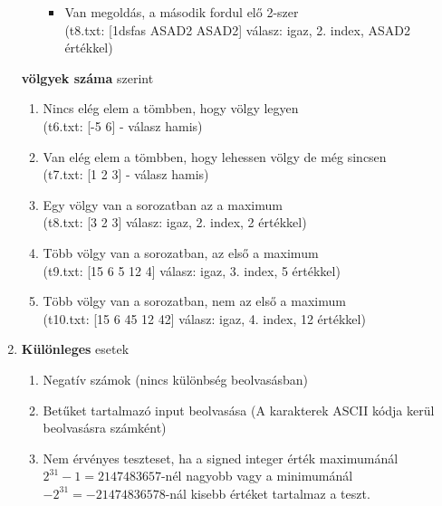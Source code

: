 \documentclass[12pt,a4paper]{article}			%
\begin{document}
\begin{enumerate}
\begin{enumerate}
\begin{itemize}[label={}]
					\item Van megoldás, a második fordul elő 2-szer\\
					(t8.txt: [1dsfas ASAD2 ASAD2] válasz: igaz, 2. index, ASAD2 értékkel)
				\end{itemize}
			\end{enumerate}
			\textbf{völgyek száma} szerint
				\begin{enumerate}
					\item Nincs elég elem a tömbben, hogy völgy legyen\\
					(t6.txt: [-5 6] - válasz hamis)
					\item Van elég elem a tömbben, hogy lehessen völgy de még sincsen\\
					(t7.txt: [1 2 3] - válasz hamis)
					\item Egy völgy van a sorozatban az a maximum\\
					(t8.txt: [3 2 3] válasz: igaz, 2. index, 2 értékkel)
					\item Több völgy van a sorozatban, az első a maximum\\
					(t9.txt: [15 6 5 12 4] válasz: igaz, 3. index, 5 értékkel)
					\item Több völgy van a sorozatban, nem az első a maximum\\
					(t10.txt: [15 6 45 12 42] válasz: igaz, 4. index, 12 értékkel)
				\end{enumerate}
			\item \textbf{Különleges} esetek
				\begin{enumerate}
					\item Negatív számok (nincs különbség beolvasásban)
					\item Betűket tartalmazó input beolvasása (A karakterek ASCII kódja kerül beolvasásra számként)
					\item Nem érvényes teszteset, ha a signed integer érték maximumánál $2^{31}-1=2147483657$-nél nagyobb vagy a minimumánál $-2^{31}=-21474836578$-nál kisebb értéket tartalmaz a teszt.
				\end{enumerate} 
		\end{enumerate}
\end{document}
